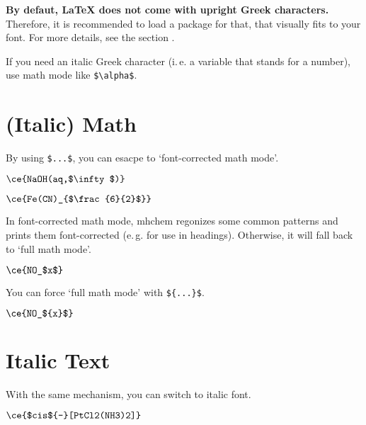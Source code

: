 \documentclass[a4paper,notitlepage,parskip=half]{scrreprt}
\begin{document}
\textbf{By defaut, \LaTeX{} does not come with upright Greek characters.} Therefore, it is recommended to load a package for that, that visually fits to your font. For more details, see the section .

If you need an italic Greek character (i.\,e. a variable that stands for a number), use math mode like \verb|$\alpha$|.


\section{(Italic) Math}

By using \verb|$...$|, you can esacpe to `font-corrected math mode'.

\begin{SideBySideExample}[xrightmargin=4cm]
  $\ce{NaOH(aq,$\infty$)}$\\
  \sffamily\bfseries
\end{SideBySideExample}

\begin{SideBySideExample}[xrightmargin=4cm]
  $\ce{Fe(CN)_{$\frac{6}{2}$}}$\\
  \sffamily\bfseries
\end{SideBySideExample}

In font-corrected math mode, mhchem regonizes some common patterns and prints them font-corrected (e.\,g. for use in headings). Otherwise, it will fall back to `full math mode'.

\begin{SideBySideExample}[xrightmargin=4cm]
  $\ce{NO_$x$}$ \sffamily\bfseries {}
\end{SideBySideExample}

You can force `full math mode' with \verb|${...}$|.

\begin{SideBySideExample}[xrightmargin=4cm]
  $\ce{NO_${x}$}$ \sffamily\bfseries {}
\end{SideBySideExample}


\section{Italic Text}

With the same mechanism, you can switch to italic font.

\begin{SideBySideExample}[xrightmargin=4cm]
  $\ce{$cis${-}[PtCl2(NH3)2]}$\\
  \sffamily\bfseries
\end{SideBySideExample}
\end{document}
